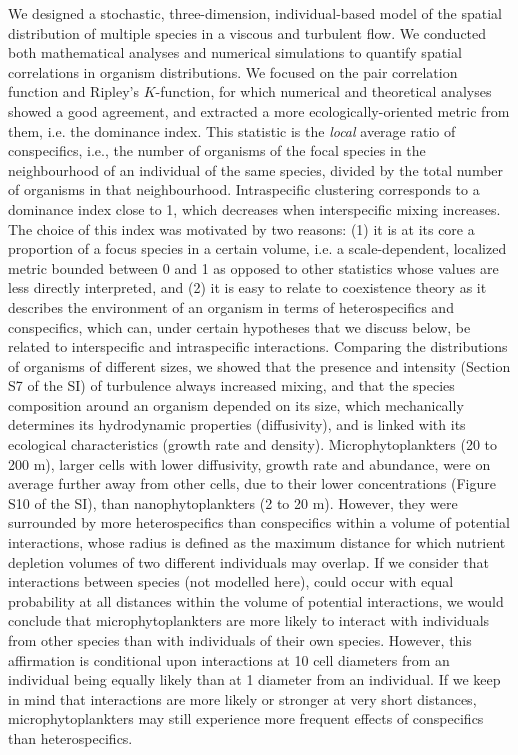 \documentclass[english]{article}
\begin{document}
We designed a stochastic, three-dimension, individual-based model
of the spatial distribution of multiple species in a viscous and turbulent
flow. We conducted both mathematical analyses and numerical simulations
to quantify spatial correlations in organism distributions. We focused
on the pair correlation function and Ripley's $K$-function, for which
numerical and theoretical analyses showed a good agreement, and extracted
a more ecologically-oriented metric from them, i.e. the dominance
index. This statistic is the \textit{local} average ratio of conspecifics,
i.e., the number of organisms of the focal species in the neighbourhood
of an individual of the same species, divided by the total number
of organisms in that neighbourhood. Intraspecific clustering corresponds
to a dominance index close to 1, which decreases when interspecific
mixing increases. The choice of this index was motivated by two reasons:
(1) it is at its core a proportion of a focus species in a certain
volume, i.e. a scale-dependent, localized metric bounded between 0
and 1 as opposed to other statistics whose values are less directly
interpreted, and (2) it is easy to relate to coexistence theory as
it describes the environment of an organism in terms of heterospecifics
and conspecifics, which can, under certain hypotheses that we discuss
below, be related to interspecific and intraspecific interactions.
Comparing the distributions of organisms of different sizes, we showed
that the presence and intensity (Section S7 of the SI) of turbulence
always increased mixing, and that the species composition around an
organism depended on its size, which mechanically determines its hydrodynamic
properties (diffusivity), and is linked with its ecological characteristics
(growth rate and density). Microphytoplankters (20 to 200 \textmu
m), larger cells with lower diffusivity, growth rate and abundance,
were on average further away from other cells, due to their lower
concentrations (Figure S10 of the SI), than nanophytoplankters (2
to 20 \textmu m). However, they were surrounded by more heterospecifics
than conspecifics within a volume of potential interactions, whose
radius is defined as the maximum distance for which nutrient depletion
volumes of two different individuals may overlap. If we consider that
interactions between species (not modelled here), could occur with
equal probability at all distances within the volume of potential
interactions, we would conclude that microphytoplankters are more
likely to interact with individuals from other species than with individuals
of their own species. However, this affirmation is conditional upon
interactions at 10 cell diameters from an individual being equally
likely than at 1 diameter from an individual. If we keep in mind that
interactions are more likely or stronger at very short distances,
microphytoplankters may still experience more frequent effects of
conspecifics than heterospecifics.
\end{document}
